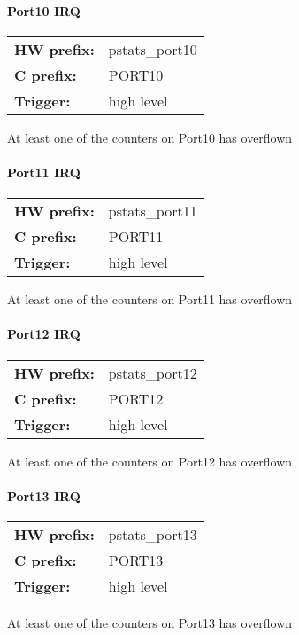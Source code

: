 \paragraph*{Port10 IRQ}\vspace{12pt}
\begin{small}
\begin{tabular}{l l }
{\bf HW prefix:}  & pstats\_port10\\
{\bf C prefix:}  & PORT10\\
{\bf Trigger:}  & high level\\
\end{tabular}

\end{small}
\vspace{12pt}
At least one of the counters on Port10 has overflown
\paragraph*{Port11 IRQ}\vspace{12pt}
\begin{small}
\begin{tabular}{l l }
{\bf HW prefix:}  & pstats\_port11\\
{\bf C prefix:}  & PORT11\\
{\bf Trigger:}  & high level\\
\end{tabular}

\end{small}
\vspace{12pt}
At least one of the counters on Port11 has overflown
\paragraph*{Port12 IRQ}\vspace{12pt}
\begin{small}
\begin{tabular}{l l }
{\bf HW prefix:}  & pstats\_port12\\
{\bf C prefix:}  & PORT12\\
{\bf Trigger:}  & high level\\
\end{tabular}

\end{small}
\vspace{12pt}
At least one of the counters on Port12 has overflown
\paragraph*{Port13 IRQ}\vspace{12pt}
\begin{small}
\begin{tabular}{l l }
{\bf HW prefix:}  & pstats\_port13\\
{\bf C prefix:}  & PORT13\\
{\bf Trigger:}  & high level\\
\end{tabular}

\end{small}
\vspace{12pt}
At least one of the counters on Port13 has overflown
